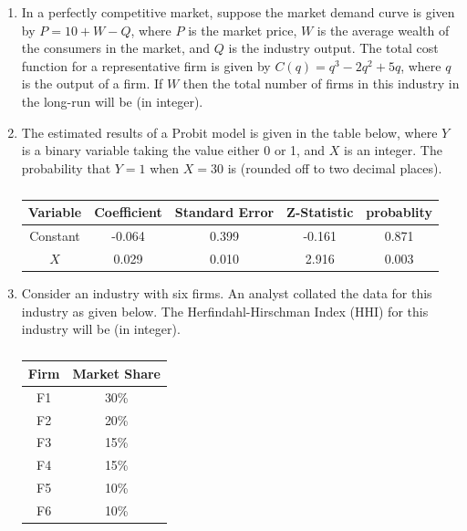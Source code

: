 \documentclass{article}
\begin{document}
\begin{enumerate}[leftmargin=*, start=45, label=Q.\arabic*.]
    \item In a perfectly competitive market, suppose the market demand curve is given by $P=10+W-Q$, where $P$ is the market price, $W$ is the average wealth of the consumers in the market, and $Q$ is the industry output. The total cost function for a representative firm is given by $C(q)=q^3-2q^2+5q$, where $q$ is the output of a firm. If $W$ then the total number of firms in this industry in the long-run will be \makebox[1cm]{\hrulefill} (in integer). 

    \item The estimated results of a Probit model is given in the table below, where $Y$ is a binary variable taking the value either 0 or 1, and $X$ is an integer. The probability that $Y=1$ when $X=30$ is \makebox[1cm]{\hrulefill} (rounded off to two decimal places). 

    \begin{table}[h]
        \centering
        \begin{tabular}{|c|c|c|c|c|}
        \hline
         Variable & Coefficient & Standard Error & Z-Statistic & probablity \\ \hline
         Constant & -0.064      & 0.399          & -0.161      & 0.871      \\ \hline
         $X$      & 0.029       & 0.010          & 2.916       & 0.003      \\ \hline
        \end{tabular}
        \caption{}
    \end{table}

    \item Consider an industry with six firms. An analyst collated the data for this industry as given below. The Herfindahl-Hirschman Index (HHI) for this industry will be \makebox[1cm]{\hrulefill} (in integer).

    \begin{table}[h]
        \centering
        \begin{tabular}{|c|c|}
        \hline
         Firm & Market Share \\ \hline
         F1   & 30\%         \\ \hline
         F2   & 20\%         \\ \hline
         F3   & 15\%         \\ \hline
         F4   & 15\%         \\ \hline
         F5   & 10\%         \\ \hline
         F6   & 10\%         \\ \hline
        \end{tabular}
        \caption{}
    \end{table}


\end{enumerate}
\end{document}
